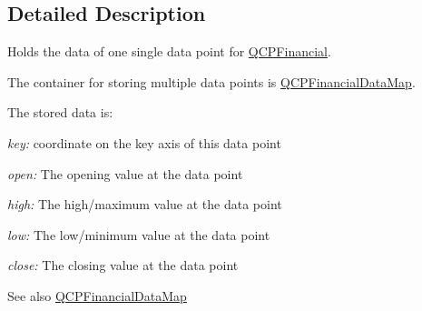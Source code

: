 \subsection{\-Detailed \-Description}
\-Holds the data of one single data point for \hyperlink{classQCPFinancial}{\-Q\-C\-P\-Financial}. 

\-The container for storing multiple data points is \hyperlink{qcustomplot_8h_a745c09823fae0974b50beca9bc3b3d7d}{\-Q\-C\-P\-Financial\-Data\-Map}.

\-The stored data is\-: \begin{DoxyItemize}
\item {\itshape key\-:\/} coordinate on the key axis of this data point \item {\itshape open\-:\/} \-The opening value at the data point \item {\itshape high\-:\/} \-The high/maximum value at the data point \item {\itshape low\-:\/} \-The low/minimum value at the data point \item {\itshape close\-:\/} \-The closing value at the data point\end{DoxyItemize}
\begin{DoxySeeAlso}{\-See also}
\hyperlink{qcustomplot_8h_a745c09823fae0974b50beca9bc3b3d7d}{\-Q\-C\-P\-Financial\-Data\-Map} 
\end{DoxySeeAlso}


